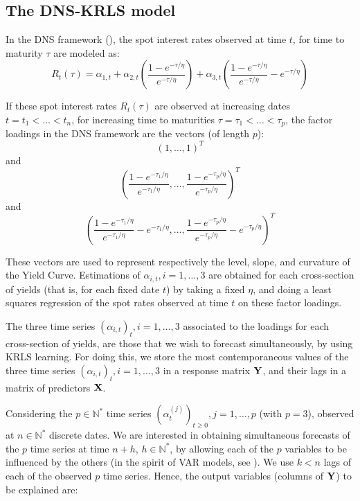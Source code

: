 \subsection{The DNS-KRLS model}

In the DNS framework (\cite{diebold2006forecasting}), the spot interest rates observed at time $t$, for time to maturity $\tau$ are modeled as:
\begin{equation}
R_t(\tau) = \alpha_{1, t} + \alpha_{2, t}\left(\frac{1-e^{-\tau/\eta}}{e^{-\tau/\eta}}\right) + \alpha_{3, t}\left(\frac{1-e^{-\tau/\eta}}{e^{-\tau/\eta}} - e^{-\tau/\eta}\right)
\end{equation}

\medskip

If these spot interest rates $R_t(\tau)$ are observed at increasing dates $t = t_1 < \ldots < t_n$, for increasing time to maturities $\tau = \tau_1 < \ldots < \tau_p$, the factor loadings in the DNS framework are the vectors (of length $p$):  
$$
(1, \ldots, 1)^T
$$
and
$$
\left(\frac{1-e^{-\tau_1/\eta}}{e^{-\tau_1/\eta}}, \ldots, \frac{1-e^{-\tau_p/\eta}}{e^{-\tau_p/\eta}}\right)^T
$$ 
and 
$$
\left(\frac{1-e^{-\tau_1/\eta}}{e^{-\tau_1/\eta}} - e^{-\tau_1/\eta}, \ldots, \frac{1-e^{-\tau_p/\eta}}{e^{-\tau_p/\eta}} - e^{-\tau_p/\eta}\right)^T
$$ 

\medskip

These vectors are used to represent respectively the level, slope, and curvature of the Yield Curve. Estimations of $\alpha_{i, t}, i = 1, \ldots, 3$ are obtained for each cross-section of yields (that is, for each fixed date $t$) by taking a fixed $\eta$, and doing a least squares regression of the spot rates observed at time $t$ on these factor loadings. 

\medskip

The three time series $(\alpha_{i, t})_t, i = 1, \ldots, 3$ associated to the loadings for each cross-section of yields, are those that we wish to forecast simultaneously, by using KRLS learning. For doing this, we store the most contemporaneous values of the three time series $(\alpha_{i, t})_t, i = 1, \ldots, 3$ in a response matrix ${\bf Y}$, and their lags in a matrix of predictors ${\bf X}$. 

\medskip

Considering the $p \in \mathbb{N}^*$ time series $(\alpha_t^{(j)})_{t \geq 0}, j = 1, \ldots, p$ (with $p = 3$),
observed at $n \in \mathbb{N}^*$ discrete dates. We are interested in
obtaining simultaneous forecasts of the $p$ time series at time $n+h$, $h \in
\mathbb{N}^*$, by allowing each of the $p$ variables to be influenced by the
others (in the spirit of VAR models, see \cite{lutkepohl2005new}). We use $k < n$ lags of each of the observed $p$ time series. Hence, the output variables (columns of ${\bf Y}$) to be explained are:


